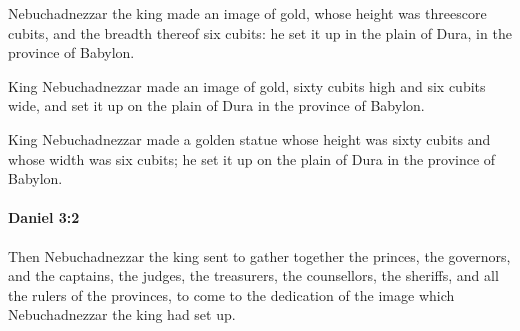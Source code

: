 			\begin{versebox}
					\item[BHS] 
					\item[LXX] 
					\item[ASV] Nebuchadnezzar the king made an image of gold, whose height was threescore cubits, and the breadth thereof six cubits: he set it up in the plain of Dura, in the province of Babylon.
					\item[NIV] King Nebuchadnezzar made an image of gold, sixty cubits high and six cubits wide, and set it up on the plain of Dura in the province of Babylon.
					\item[NRSV] King Nebuchadnezzar made a golden statue whose height was sixty cubits and whose width was six cubits; he set it up on the plain of Dura in the province of Babylon.
			\end{versebox}

		\paragraph{Daniel 3:2} %
			\label{DANIEL-3-2}

			Then Nebuchadnezzar the king sent to gather together the princes, the governors, and the captains, the judges, the treasurers, the counsellors, the sheriffs, and all the rulers of the provinces, to come to the dedication of the image which Nebuchadnezzar the king had set up.

